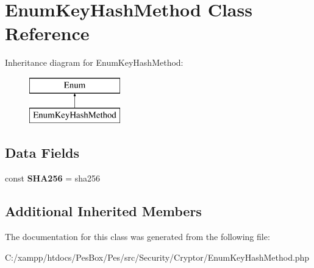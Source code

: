 \hypertarget{class_pes_1_1_security_1_1_cryptor_1_1_enum_key_hash_method}{}\section{Enum\+Key\+Hash\+Method Class Reference}
\label{class_pes_1_1_security_1_1_cryptor_1_1_enum_key_hash_method}
Inheritance diagram for Enum\+Key\+Hash\+Method\+:\begin{figure}[H]
\begin{center}
\leavevmode
\includegraphics[height=2.000000cm]{class_pes_1_1_security_1_1_cryptor_1_1_enum_key_hash_method}
\end{center}
\end{figure}
\subsection*{Data Fields}
\begin{DoxyCompactItemize}
\item 
\mbox{\label{class_pes_1_1_security_1_1_cryptor_1_1_enum_key_hash_method_a1da6a23e402d78abbbdcb1dfa2c31581}} 
const {\bfseries S\+H\+A256} = \textquotesingle{}sha256\textquotesingle{}
\end{DoxyCompactItemize}
\subsection*{Additional Inherited Members}


The documentation for this class was generated from the following file\+:\begin{DoxyCompactItemize}
\item 
C\+:/xampp/htdocs/\+Pes\+Box/\+Pes/src/\+Security/\+Cryptor/Enum\+Key\+Hash\+Method.\+php\end{DoxyCompactItemize}
